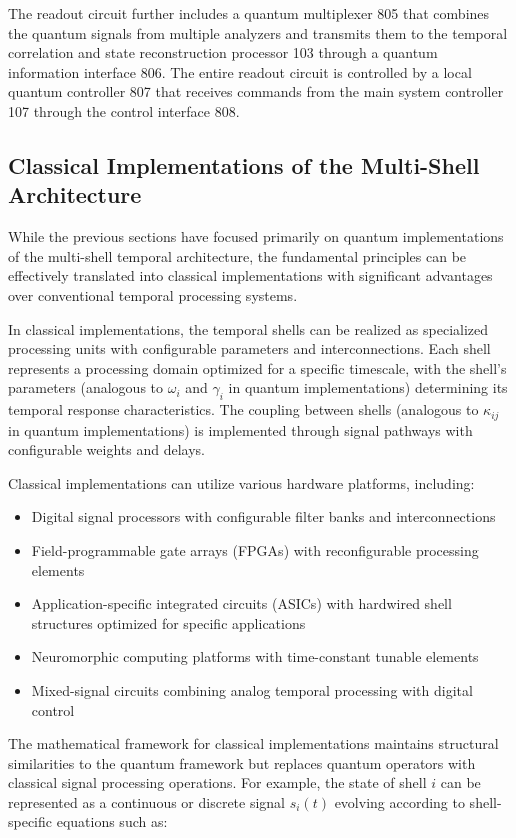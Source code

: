 \documentclass[12pt,letterpaper]{article}
\begin{document}
The readout circuit further includes a quantum multiplexer 805 that combines the quantum signals from multiple analyzers and transmits them to the temporal correlation and state reconstruction processor 103 through a quantum information interface 806. The entire readout circuit is controlled by a local quantum controller 807 that receives commands from the main system controller 107 through the control interface 808.

\subsection{Classical Implementations of the Multi-Shell Architecture}

While the previous sections have focused primarily on quantum implementations of the multi-shell temporal architecture, the fundamental principles can be effectively translated into classical implementations with significant advantages over conventional temporal processing systems.

In classical implementations, the temporal shells can be realized as specialized processing units with configurable parameters and interconnections. Each shell represents a processing domain optimized for a specific timescale, with the shell's parameters (analogous to $\omega_i$ and $\gamma_i$ in quantum implementations) determining its temporal response characteristics. The coupling between shells (analogous to $\kappa_{ij}$ in quantum implementations) is implemented through signal pathways with configurable weights and delays.

Classical implementations can utilize various hardware platforms, including:

\begin{itemize}
    \item Digital signal processors with configurable filter banks and interconnections
    \item Field-programmable gate arrays (FPGAs) with reconfigurable processing elements
    \item Application-specific integrated circuits (ASICs) with hardwired shell structures optimized for specific applications
    \item Neuromorphic computing platforms with time-constant tunable elements
    \item Mixed-signal circuits combining analog temporal processing with digital control
\end{itemize}

The mathematical framework for classical implementations maintains structural similarities to the quantum framework but replaces quantum operators with classical signal processing operations. For example, the state of shell $i$ can be represented as a continuous or discrete signal $s_i(t)$ evolving according to shell-specific equations such as:
\end{document}
